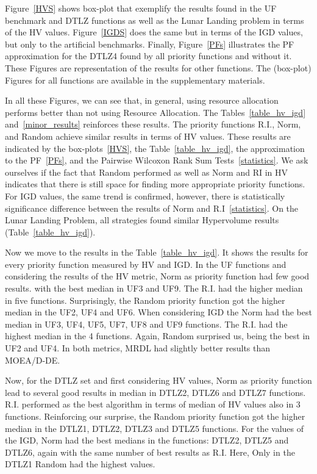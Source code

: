 Figure~\ref{HVS} shows box-plot that exemplify the results found in the UF benchmark and DTLZ functions as well as the Lunar Landing problem in terms of the HV values. Figure~\ref{IGDS} does the same but in terms of the IGD values, but only to the artificial benchmarks. Finally, Figure~\ref{PFs} illustrates the PF approximation for the DTLZ4 found by all priority functions and without it. These Figures are representation of the results for other functions. The (box-plot) Figures for all functions are available in the supplementary materials.

In all these Figures, we can see that, in general, using resource allocation performs better than not using Resource Allocation. The Tables~\ref{table_hv_igd} and~\ref{minor_results} reinforces these results. The priority functions R.I., Norm, and Random achieve similar results in terms of HV values. These results are indicated by the box-plots~\ref{HVS}, the Table~\ref{table_hv_igd}, the approximation to the PF~\ref{PFs}, and the Pairwise Wilcoxon Rank Sum Tests~\ref{statistics}. We ask ourselves if the fact that Random performed as well as Norm and RI in HV indicates that there is still space for finding more appropriate priority functions. For IGD values, the same trend is confirmed, however, there is statistically significance difference between the results of Norm and R.I~\ref{statistics}. On the Lunar Landing Problem, all strategies found similar Hypervolume results (Table~\ref{table_hv_igd}). 

Now we move to the results in the Table~\ref{table_hv_igd}. It shows the results for every priority function measured by HV and IGD. In the UF functions and considering the results of the HV metric, Norm as priority function had few good results. with the best median in UF3 and UF9. The R.I. had the higher median in five functions. Surprisingly, the Random priority function got the higher median in the UF2, UF4 and UF6. When considering IGD the Norm had the best median in UF3, UF4, UF5, UF7, UF8 and UF9 functions. The R.I. had the highest median in the 4 functions. Again, Random surprised us, being the best in UF2 and UF4. In both metrics, MRDL had slightly better results than MOEA/D-DE.

Now, for the DTLZ set and first considering HV values, Norm as priority function lead to several good results in median in DTLZ2, DTLZ6 and DTLZ7 functions. R.I. performed as the best algorithm in terms of median of HV values also in 3 functions. Reinforcing our surprise, the Random priority function got the higher median in the DTLZ1, DTLZ2, DTLZ3 and DTLZ5 functions. For the values of the IGD, Norm had the best medians in the functions: DTLZ2, DTLZ5 and DTLZ6, again with the same number of best results as R.I. Here, Only in the DTLZ1 Random had the highest values.


